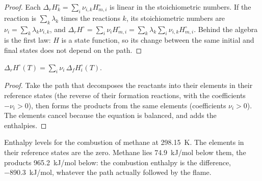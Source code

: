 \begin{proof}
Each $\Delta_r H_k^\circ = \sum_i\nu_{i,k}H_{m,i}^\circ$ is linear in the
stoichiometric numbers. If the reaction is $\sum_k\lambda_k$ times the
reactions $k$, its stoichiometric numbers are $\nu_i = \sum_k\lambda_k
\nu_{i,k}$, and $\Delta_r H^\circ = \sum_i\nu_iH_{m,i}^\circ = \sum_k\lambda_k
\sum_i\nu_{i,k}H_{m,i}^\circ$. Behind the algebra is the first law: $H$ is a
state function, so its change between the same initial and final states
does not depend on the path.
\end{proof}

\begin{proposition}\label{prop:b2:reaction-enthalpy:formation-sum}
$\Delta_r H^\circ(T) = \sum_i\nu_i\,\Delta_f H_i^\circ(T)$.
\end{proposition}

\begin{proof}
Take the path that decomposes the reactants into their elements in their
reference states (the reverse of their formation reactions, with the
coefficients $-\nu_i > 0$), then forms the products from the same elements
(coefficients $\nu_i > 0$). The elements cancel because the equation is
balanced, and  adds the enthalpies.
\end{proof}

\begin{omfigure}

{\small Enthalpy levels for the combustion of methane at \qty{298.15}{K}.
The elements in their reference states are the zero. Methane lies
\qty{74.9}{kJ/mol} below them, the products \qty{965.2}{kJ/mol} below:
the combustion enthalpy is the difference, \qty{-890.3}{kJ/mol}, whatever
the path actually followed by the flame.}
\end{omfigure}

